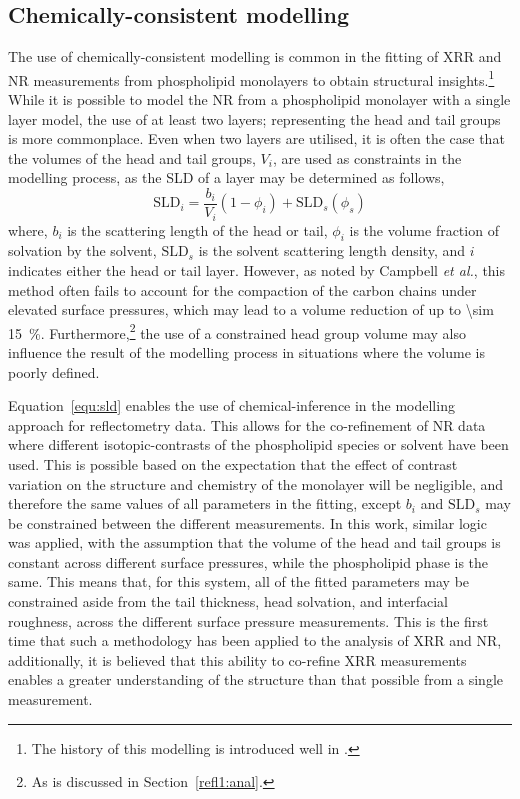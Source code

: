 \subsection{Chemically-consistent modelling}
The use of chemically-consistent modelling is common in the fitting of XRR and NR measurements from phospholipid monolayers to obtain structural insights.\footnote{The history of this modelling is introduced well in \cite{campbell_structure_2018}.}
While it is possible to model the NR from a phospholipid monolayer with a single layer model,\autocite{wojciechowski_interaction_2016,wojciechowski_complexation_2016} the use of at least two layers; representing the head and tail groups is more commonplace.\autocite{foglia_interaction_2014,bello_influence_2016}
Even when two layers are utilised, it is often the case that the volumes of the head and tail groups, $V_i$, are used as constraints in the modelling process, as the SLD of a layer may be determined as follows,
%
\begin{equation}
\text{SLD}_i = \frac{b_i}{V_i}(1-\phi_i)+\text{SLD}_s(\phi_s)
\label{equ:sld}
\end{equation}
%
where, $b_i$ is the scattering length of the head or tail, $\phi_i$ is the volume fraction of solvation by the solvent, $\text{SLD}_s$ is the solvent scattering length density, and $i$ indicates either the head or tail layer.
However, as noted by Campbell \emph{et al.},\autocite{campbell_structure_2018} this method often fails to account for the compaction of the carbon chains under elevated surface pressures,\autocite{mcconlogue_close_1997,small_lateral_1984} which may lead to a volume reduction of up to \SI{\sim 15}{\percent}.
Furthermore,\footnote{As is discussed in Section~\ref{refl1:anal}.} the use of a constrained head group volume may also influence the result of the modelling process in situations where the volume is poorly defined.

Equation~\ref{equ:sld} enables the use of chemical-inference in the modelling approach for reflectometry data.
This allows for the co-refinement of NR data where different isotopic-contrasts of the phospholipid species or solvent have been used.
This is possible based on the expectation that the effect of contrast variation on the structure and chemistry of the monolayer will be negligible, and therefore the same values of all parameters in the fitting, except $b_i$ and $\text{SLD}_s$ may be constrained between the different measurements.\autocite{hollinshead_effects_2009}
In this work, similar logic was applied, with the assumption that the volume of the head and tail groups is constant across different surface pressures, while the phospholipid phase is the same.
This means that, for this system, all of the fitted parameters may be constrained aside from the tail thickness, head solvation, and interfacial roughness, across the different surface pressure measurements.
This is the first time that such a methodology has been applied to the analysis of XRR and NR, additionally, it is believed that this ability to co-refine XRR measurements enables a greater understanding of the structure than that possible from a single measurement.
